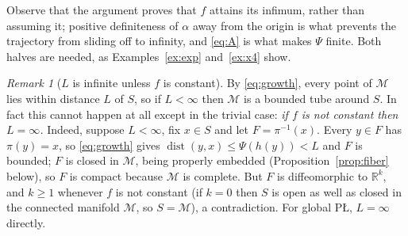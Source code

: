 \documentclass[11pt]{article}
\theoremstyle{plain}
\theoremstyle{definition}
\theoremstyle{remark}
\newtheorem{rem}[thm]{Remark}
\newcommand{\M}{\mathcal{M}}
\newcommand{\R}{\mathbb{R}}
\DeclareMathOperator{\dist}{dist}
\begin{document}
Observe that the argument proves that $f$ attains its infimum, rather than
assuming it; positive definiteness of $\alpha$ away from the origin is what
prevents the trajectory from sliding off to infinity, and \eqref{eq:A} is what
makes $\Psi$ finite. Both halves are needed, as Examples~\ref{ex:exp}
and~\ref{ex:x4} show.

\begin{rem}[$L$ is infinite unless $f$ is constant]\label{rem:L}
By \eqref{eq:growth}, every point of $\M$ lies within distance $L$ of $S$, so if
$L<\infty$ then $\M$ is a bounded tube around $S$. In fact this cannot happen at
all except in the trivial case: \emph{if $f$ is not constant then $L=\infty$.}
Indeed, suppose $L<\infty$, fix $x\in S$ and let $F=\pi^{-1}(x)$. Every $y\in F$
has $\pi(y)=x$, so \eqref{eq:growth} gives $\dist(y,x)\le\Psi(h(y))<L$ and $F$ is
bounded; $F$ is closed in $\M$, being properly embedded
(Proposition~\ref{prop:fiber} below), so $F$ is compact because $\M$ is complete. But
$F$ is diffeomorphic to $\R^k$, and $k\ge1$ whenever $f$ is not constant (if
$k=0$ then $S$ is open as well as closed in the connected manifold $\M$, so
$S=\M$), a contradiction. For global P\L{}, $L=\infty$ directly.
\end{rem}
\end{document}
